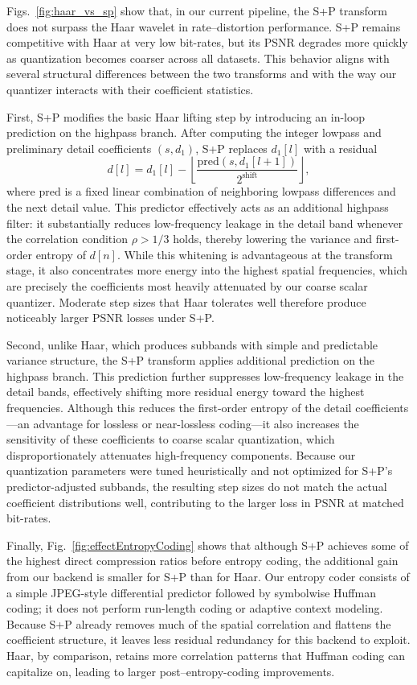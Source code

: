 Figs.~\ref{fig:haar_vs_sp} show that, in our current pipeline, the S+P transform does not surpass the Haar wavelet in rate--distortion performance. S+P remains competitive with Haar at very low bit-rates, but its PSNR degrades more quickly as quantization becomes coarser across all datasets. This behavior aligns with several structural differences between the two transforms and with the way our quantizer interacts with their coefficient statistics.

First, S+P modifies the basic Haar lifting step by introducing an in-loop prediction on the highpass branch. After computing the integer lowpass and preliminary detail coefficients $(s, d_1)$, S+P replaces $d_1[l]$ with a residual
\[
d[l] = d_1[l] - 
\left\lfloor 
    \frac{\mathrm{pred}(s, d_1[l+1])}{2^{\text{shift}}}
\right\rfloor,
\]
where $\mathrm{pred}$ is a fixed linear combination of neighboring lowpass differences and the next detail value. This predictor effectively acts as an additional highpass filter: it substantially reduces low-frequency leakage in the detail band whenever the correlation condition $\rho > 1/3$ holds, thereby lowering the variance and first-order entropy of $d[n]$. While this whitening is advantageous at the transform stage, it also concentrates more energy into the highest spatial frequencies, which are precisely the coefficients most heavily attenuated by our coarse scalar quantizer. Moderate step sizes that Haar tolerates well therefore produce noticeably larger PSNR losses under S+P.

Second, unlike Haar, which produces subbands with simple and predictable variance structure, the S+P transform applies additional prediction on the highpass branch. This prediction further suppresses low-frequency leakage in the detail bands, effectively shifting more residual energy toward the highest frequencies. Although this reduces the first-order entropy of the detail coefficients—an advantage for lossless or near-lossless coding—it also increases the sensitivity of these coefficients to coarse scalar quantization, which disproportionately attenuates high-frequency components. Because our quantization parameters were tuned heuristically and not optimized for S+P’s predictor-adjusted subbands, the resulting step sizes do not match the actual coefficient distributions well, contributing to the larger loss in PSNR at matched bit-rates.

Finally, Fig.~\ref{fig:effectEntropyCoding} shows that although S+P achieves some of the highest direct compression ratios before entropy coding, the additional gain from our backend is smaller for S+P than for Haar. Our entropy coder consists of a simple JPEG-style differential predictor followed by symbolwise Huffman coding; it does not perform run-length coding or adaptive context modeling. Because S+P already removes much of the spatial correlation and flattens the coefficient structure, it leaves less residual redundancy for this backend to exploit. Haar, by comparison, retains more correlation patterns that Huffman coding can capitalize on, leading to larger post–entropy-coding improvements.


